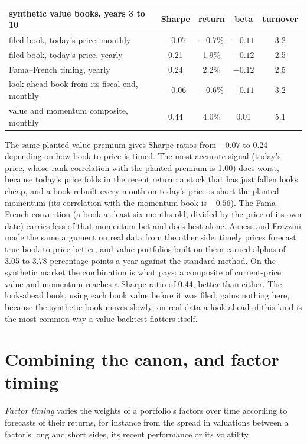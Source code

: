 \begin{center}
\small
\begin{tabular}{@{}lcccc@{}}
\toprule
synthetic value books, years 3 to 10 & Sharpe & return & beta & turnover\\
\midrule
filed book, today's price, monthly & $-0.07$ & $-0.7\%$ & $-0.11$ & 3.2\\
filed book, today's price, yearly & 0.21 & 1.9\% & $-0.12$ & 2.5\\
Fama--French timing, yearly & 0.24 & 2.2\% & $-0.12$ & 2.5\\
look-ahead book from its fiscal end, monthly & $-0.06$ & $-0.6\%$ & $-0.11$ & 3.2\\
value and momentum composite, monthly & 0.44 & 4.0\% & 0.01 & 5.1\\
\bottomrule
\end{tabular}
\end{center}

The same planted value premium gives Sharpe ratios from $-0.07$ to 0.24 depending on how book-to-price is timed. The most accurate signal (today's price,
whose rank correlation with the planted premium is 1.00) does worst, because today's price folds in the recent return: a stock that has just fallen looks
cheap, and a book rebuilt every month on today's price is short the planted momentum (its correlation with the momentum book is $-0.56$). The Fama--French
convention (a book at least six months old, divided by the price of its own date) carries less of that momentum bet and does best alone. Asness and Frazzini made the same
argument on real data from the other side: timely prices forecast true book-to-price better, and value portfolios built on them earned alphas of 3.05 to 3.78
percentage points a year against the standard method. On the synthetic market the combination is what pays: a composite of
current-price value and momentum reaches a Sharpe ratio of 0.44, better than either. The look-ahead book, using each book value before it was filed, gains
nothing here, because the synthetic book moves slowly; on real data a look-ahead of this kind is the most common way a value backtest flatters itself.

\section{Combining the canon, and factor timing}

\begin{definition}\label{def:s1:value-quality-and-low-risk:timing}
\emph{Factor timing} varies the weights of a portfolio's factors over time according to forecasts of their returns, for instance from
the spread in valuations between a factor's long and short sides, its recent performance or its volatility.
\end{definition}

